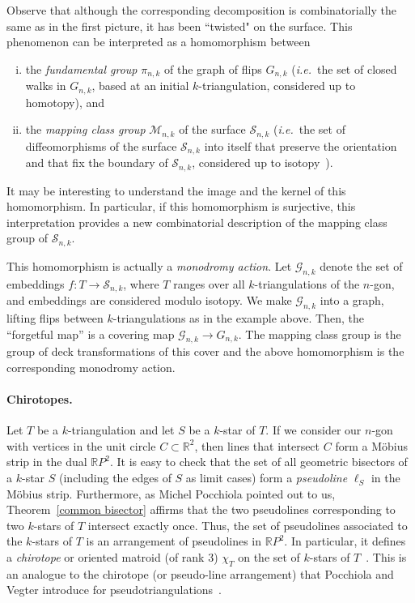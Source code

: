 \documentclass[12pt]{amsart}
\begin{document}
Observe that although the corresponding decomposition is combinatorially the same as in the first picture, it has been ``twisted" on the surface. This phenomenon can be interpreted as a homomorphism between
\begin{enumerate}[(i)]
\item the \emph{fundamental group} $\pi_{n,k}$ of the graph of flips $G_{n,k}$ ({\it i.e.}~the set of closed walks in $G_{n,k}$, based at an initial $k$-triangulation, considered up to homotopy), and
\item the \emph{mapping class group} $\mathcal{M}_{n,k}$ of the surface $\mathcal{S}_{n,k}$ ({\it i.e.}~the set of diffeomorphisms of the surface $\mathcal{S}_{n,k}$ into itself that preserve the orientation and that fix the boundary of $\mathcal{S}_{n,k}$, considered up to isotopy~\cite{b-blmcg-74,i-mcg-02}).
\end{enumerate}
It may be interesting to understand the image and the kernel of this homomorphism. In particular, if this homomorphism is surjective, this interpretation provides a new combinatorial description of the mapping class group of $\mathcal{S}_{n,k}$.

This homomorphism is actually a \emph{monodromy action}. Let $\mathcal{G}_{n,k}$ denote the set of embeddings $f:T\to \mathcal{S}_{n,k}$, where $T$ ranges over all $k$-triangulations of the $n$-gon, and embeddings are considered modulo isotopy. We make
$\mathcal{G}_{n,k}$ into a graph, lifting flips between $k$-triangulations as in the example above. Then, the ``forgetful map'' is a covering map
$
\mathcal{G}_{n,k} \to G_{n,k}.
$
The mapping class group is the group of deck transformations of this cover and the above homomorphism is the corresponding monodromy action.

\bigskip

\paragraph{{\sc Chirotopes.}}

Let $T$ be a $k$-triangulation and let $S$ be a $k$-star of $T$. 
If we consider our $n$-gon with vertices in the unit circle $C\subset \mathbb{R}^2$, then lines that intersect $C$ form a M\"obius strip in the dual $\mathbb{R}P^2$. It is easy to check that the set of all geometric bisectors of a $k$-star $S$ (including the edges of $S$ as limit cases) form a \emph{pseudoline} $\ell_S$ in the M\"obius strip. Furthermore, as Michel Pocchiola pointed out to us, Theorem~\ref{common bisector} affirms that the two pseudolines corresponding to two $k$-stars of $T$ intersect exactly once. Thus, the set of pseudolines associated to the $k$-stars of $T$ is an arrangement of pseudolines in $\mathbb{R}P^2$. In particular, it defines a \emph{chirotope} or oriented matroid (of rank $3$) $\chi_T$ on the set of $k$-stars of $T$~\cite{blvswz-om-92,k-ah-92,rgz-om-04}. This is an analogue to the chirotope (or pseudo-line arrangement) that Pocchiola and Vegter introduce for pseudotriangulations~\cite{pv-ot-94,pv-vc-96,rss-pt-06}.
\end{document}
